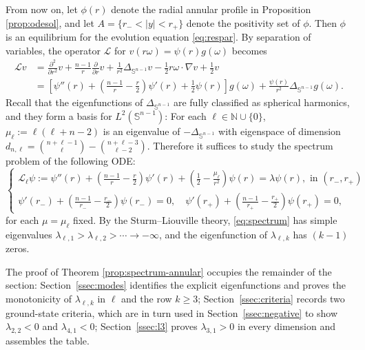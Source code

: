 \documentclass[11pt]{article}
\numberwithin{equation}{section}
\theoremstyle{definition}
\begin{document}
From now on, let $\phi(r)$ denote the radial annular profile in Proposition \ref{prop:odesol}, and let $A=\{r_-<|y|<r_+ \}$ denote the positivity set of $\phi$. Then $\phi$ is an equilibrium for the evolution equation \eqref{eq:respar}.
By  separation of variables, the operator $\mathscr{L}$ for $v(r\omega) = \psi(r)g(\omega)$ becomes 
\begin{align*}
    \mathscr{L} v & = \frac{\partial^2}{\partial r^2} v + \frac{n-1}{r} \frac{\partial}{\partial r} v + \frac{1}{r^2} \Delta_{\mathbb{S}^{n-1}} v - \frac12 r\omega \cdot \nabla v + \frac12 v \\
    & = \left[\psi''(r) + \left( \frac{n-1}{r} - \frac{r}{2} \right) \psi'(r) + \frac12 \psi(r) \right] g(\omega) + \frac{\psi(r)}{r^2} \Delta_{\mathbb{S}^{n-1}} g(\omega).
\end{align*}
Recall that the eigenfunctions of $\Delta_{\mathbb{S}^{n-1}}$ are fully classified as spherical harmonics, and they form a basis for $L^2(\mathbb{S}^{n-1})$: For each $\ell\in \mathbb{N}\cup\{0\}$, $\mu_{\ell} := \ell(\ell+n-2)$ is an eigenvalue of $-\Delta_{\mathbb{S}^{n-1}}$ with eigenspace of dimension \(d_{n,\ell}=\binom{n+\ell-1}{\ell}-\binom{n+\ell-3}{\ell-2}\).
Therefore it suffices to study the spectrum problem of the following ODE:
\begin{equation}\label{eq:spectrum}
    \left\{\begin{array}{l}
    	\mathscr{L}_{\ell}\psi:=\psi''(r) + \left( \frac{n-1}{r} - \frac{r}{2} \right) \psi'(r) + \left( \frac12 - \frac{\mu_\ell}{r^2} \right) \psi(r) = \lambda \psi(r), \text{ in } (r_-,r_+) \\[5pt]
    	\psi'(r_-) + \left( \frac{n-1}{r_-} - \frac{r_-}{2} \right) \psi(r_-) = 0, \quad \psi'(r_+) + \left( \frac{n-1}{r_+} - \frac{r_+}{2} \right) \psi(r_+) = 0,
    \end{array}  \right.\tag{$L_s$}
\end{equation}
for each $\mu= \mu_\ell$ fixed.
By the Sturm--Liouville theory, \eqref{eq:spectrum} has simple eigenvalues $\lambda_{\ell,1} > \lambda_{\ell,2} > \cdots \to -\infty$, and the eigenfunction of $\lambda_{\ell,k}$ has $(k-1)$ zeros.



The proof of Theorem \ref{prop:spectrum-annular} occupies the remainder of the section: Section~\ref{ssec:modes} identifies the explicit eigenfunctions and proves the monotonicity of $\lambda_{\ell,k}$ in $\ell$ and the row $k\geq3$; Section~\ref{ssec:criteria} records two ground-state criteria, which are in turn used in Section~\ref{ssec:negative} to show $\lambda_{2,2}<0$ and $\lambda_{4,1}<0$; Section~\ref{ssec:l3} proves $\lambda_{3,1}>0$ in every dimension and assembles the table.
\end{document}
